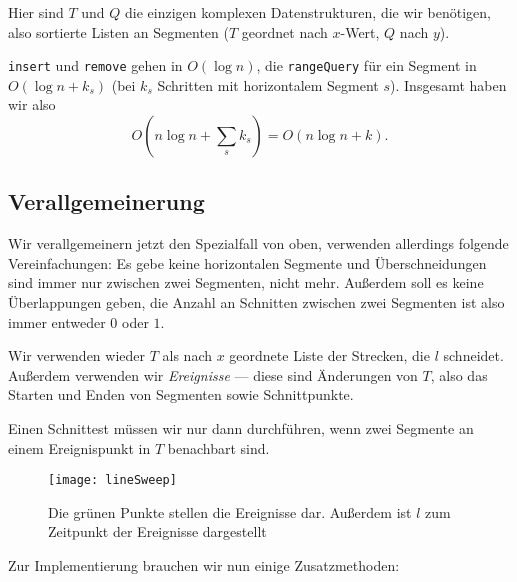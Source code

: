 Hier sind \( T \) und \( Q \) die einzigen komplexen Datenstrukturen, die wir benötigen, also sortierte Listen an Segmenten (\( T \) geordnet nach \( x \)-Wert, \( Q \) nach \( y \)).

\texttt{insert} und \texttt{remove} gehen in \( O(\log n) \), die \texttt{rangeQuery} für ein Segment in \( O(\log n + k_s) \) (bei \( k_s \) Schritten mit horizontalem Segment \( s \)). Insgesamt haben wir also
\begin{equation*}
  O(n\log n + \sum_s k_s) = O(n\log n + k)\text{.}
\end{equation*}

\subsection{Verallgemeinerung}

Wir verallgemeinern jetzt den Spezialfall von oben, verwenden allerdings folgende Vereinfachungen: Es gebe keine horizontalen Segmente und Überschneidungen sind immer nur zwischen zwei Segmenten, nicht mehr. Außerdem soll es keine Überlappungen geben, die Anzahl an Schnitten zwischen zwei Segmenten ist also immer entweder \( 0 \) oder \( 1 \).

\begin{minipage}{.6\textwidth}
  \vspace*{1em}
  Wir verwenden wieder \( T \) als nach \( x \) geordnete Liste der Strecken, die \( l \) schneidet. Außerdem verwenden wir \emph{Ereignisse} --- diese sind Änderungen von \( T \), also das Starten und Enden von Segmenten sowie Schnittpunkte.

  Einen Schnittest müssen wir nur dann durchführen, wenn zwei Segmente an einem Ereignispunkt in \( T \) benachbart sind.
  \vspace*{1em}
\end{minipage}
\hfill
\begin{minipage}{.35\textwidth}
  \vspace*{1em}
  \begin{figure}[H]
    \texttt{[image: lineSweep]}
    \caption{Die grünen Punkte stellen die Ereignisse dar. Außerdem ist \( l \) zum Zeitpunkt der Ereignisse dargestellt}
  \end{figure}
  \vspace*{1em}
\end{minipage}

Zur Implementierung brauchen wir nun einige Zusatzmethoden:

